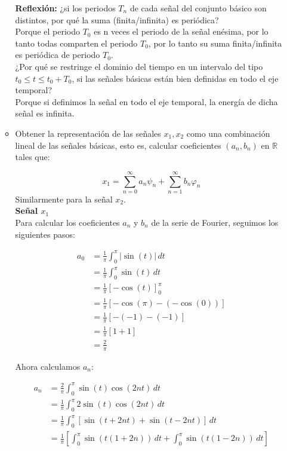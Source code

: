 \documentclass[12pt,a4paper]{report}
\begin{document}
\begin{enumerate}[label=\alph*),left=0pt]
\begin{itemize}[left=0pt]
	\textbf{Reflexión:} ¿si los periodos $T_n$ de cada señal del conjunto básico son distintos, por qué la suma 
      (finita/infinita) es periódica? \\
	Porque el periodo $T_0$ es n veces el periodo de la señal enésima, por lo tanto todas comparten el periodo $T_0$, por lo tanto su suma finita/infinita es periódica de periodo $T_0$.\\

	¿Por qué se restringe el dominio del tiempo en un intervalo del tipo 
      $t_0 \leq t \leq t_0 + T_0$, si las señales básicas están bien definidas en todo el eje temporal?\\
		Porque si definimos la señal en todo el eje temporal, la energía de dicha señal es infinita.
   \item Obtener la representación de las señales $x_1, x_2$ como una combinación lineal de las señales básicas, 
     esto es, calcular coeficientes $(a_n, b_n)$ en $\mathbb{R}$ tales que:

     $$x_1 = \sum_{n=0}^{\infty} a_n \psi_n + \sum_{n=1}^{\infty} b_n \varphi_n$$
     Similarmente para la señal $x_2$.\\

  \textbf{Señal $x_1$}\\
  Para calcular los coeficientes \(a_n\) y \(b_n\) de la serie de Fourier, seguimos los siguientes pasos:

  $$
  \begin{aligned}
    a_0 &= \frac{1}{\pi} \int_0^\pi |\sin(t)| \, dt \\
        &= \frac{1}{\pi} \int_0^\pi \sin(t) \, dt \\
        &= \frac{1}{\pi} \left[ -\cos(t) \right]_0^\pi \\
        &= \frac{1}{\pi} \left[ -\cos(\pi) - (-\cos(0)) \right] \\
        &= \frac{1}{\pi} \left[ -(-1) - (-1) \right] \\
        &= \frac{1}{\pi} \left[ 1 + 1 \right] \\
        &= \frac{2}{\pi}
  \end{aligned}
  $$
  
  Ahora calculamos \(a_n\):
  
  $$
  \begin{aligned}
    a_n &= \frac{2}{\pi} \int_0^\pi \sin(t) \cos(2nt) \, dt \\
        &= \frac{1}{\pi} \int_0^\pi 2 \sin(t) \cos(2nt) \, dt \\
        &= \frac{1}{\pi} \int_0^\pi \left[ \sin(t + 2nt) + \sin(t - 2nt) \right] \, dt \\
        &= \frac{1}{\pi} \left[ \int_0^\pi \sin(t(1 + 2n)) \, dt + \int_0^\pi \sin(t(1 - 2n)) \, dt \right]
  \end{aligned}
  $$
  

\end{itemize}
\end{enumerate}
\end{document}
